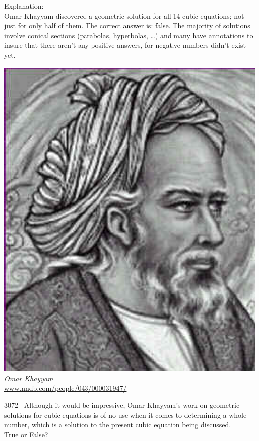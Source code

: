 \documentclass[letterpaper, 12pt]{article}
\begin{document}
Explanation:\\
Omar Khayyam discovered a geometric solution for all 14 cubic equations; not just for only half of them. The correct answer is: false. The majority of solutions involve conical sections (parabolas, hyperbolas, \dots) and many have annotations to insure that there aren't any positive answers, for negative numbers didn't exist yet.
\begin{center}
\includegraphics[scale=0.3]{Omar_Khayyam.eps}\\
\emph{{\small Omar Khayyam}}\\
\href{http://www.nndb.com/people/043/000031947/}{www.nndb.com/people/043/000031947/}\\[5mm]
\end{center}



3072-- Although it would be impressive,  Omar Khayyam's work on geometric solutions for cubic equations is of no use when it comes to determining a whole number, which is a solution to the present cubic equation being discussed.\\
True or False?\\
\end{document}
